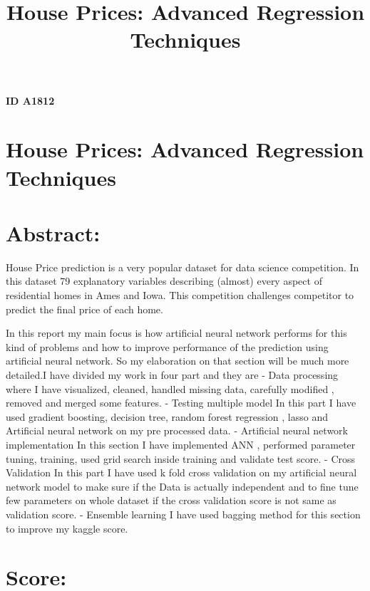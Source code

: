 \documentclass[11pt, a4paper , landscape]{article}
\title{ House Prices: Advanced Regression Techniques }
\begin{document}
    
    
    \maketitle
    
    

    
    \textbf{ID A1812}


    \section{House Prices: Advanced Regression
Techniques}\label{house-prices-advanced-regression-techniques}

    \section{Abstract:}\label{abstract}

House Price prediction is a very popular dataset for data science
competition. In this dataset 79 explanatory variables describing
(almost) every aspect of residential homes in Ames and Iowa. This
competition challenges competitor to predict the final price of each
home.

In this report my main focus is how artificial neural network performs
for this kind of problems and how to improve performance of the
prediction using artificial neural network. So my elaboration on that
section will be much more detailed.I have divided my work in four part
and they are - Data processing where I have visualized, cleaned, handled
missing data, carefully modified , removed and merged some features. -
Testing multiple model In this part I have used gradient boosting,
decision tree, random forest regression , lasso and Artificial neural
network on my pre processed data. - Artificial neural network
implementation In this section I have implemented ANN , performed
parameter tuning, training, used grid search inside training and
validate test score. - Cross Validation In this part I have used k fold
cross validation on my artificial neural network model to make sure if
the Data is actually independent and to fine tune few parameters on
whole dataset if the cross validation score is not same as validation
score. - Ensemble learning I have used bagging method for this section
to improve my kaggle score.

    \section{Score:}\label{score}
\end{document}
